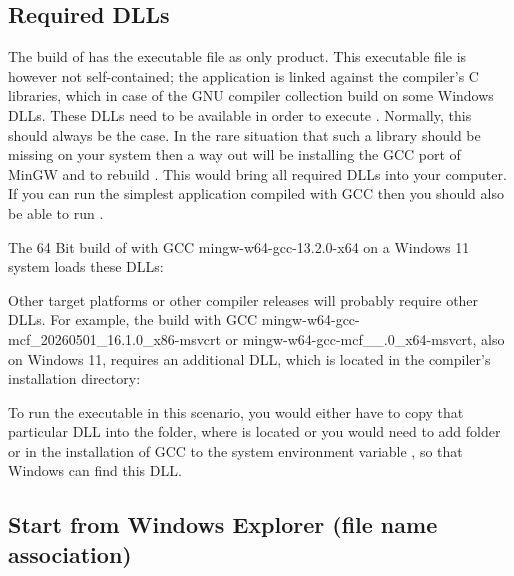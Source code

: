 \subsection{Required DLLs}

The build of \linnet{} has the executable file  as only
product. This executable file is however not self-contained; the
application is linked against the compiler's C libraries, which in case of
the GNU compiler collection build on some Windows DLLs. These DLLs need to
be available in order to execute \linnet{}. Normally, this should always
be the case. In the rare situation that such a library should be missing on
your system then a way out will be installing the GCC port of MinGW
and to rebuild \linnet{}. This would bring all required DLLs into your
computer. If you can run the simplest  application
compiled with GCC then you should also be able to run \linnet{}.

The 64 Bit build of \linnet{} with GCC mingw-w64-gcc-13.2.0-x64 on a
Windows 11 system loads these DLLs:\newline

\noindent
{}\newline
{}\newline
{}\newline
{}\newline

Other target platforms or other compiler releases will probably require
other DLLs. For example, the build with GCC
mingw-w64-gcc-mcf\_20260501\_16.1.0\_x86-msvcrt or
mingw-w64-\-gcc-\-mcf\_\_.0\_x64-msvcrt, also on Windows
11, requires an additional DLL, which is located in the compiler's
installation directory:\newline

\noindent
{}\newline

To run the \linnet{} executable in this scenario, you would either have to
copy that particular DLL into the folder, where  is
located or you would need to add folder  or
 in the installation of GCC to the system
environment variable , so that Windows can find this DLL.

\subsection{Start from Windows Explorer (file name association)}

